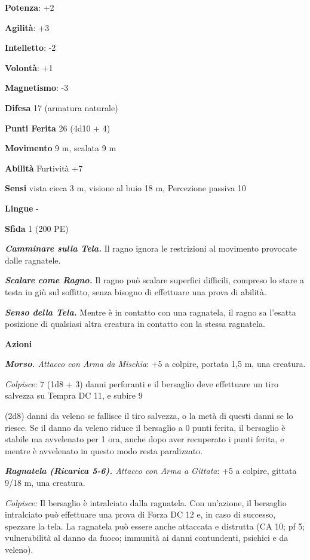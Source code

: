 \begin{multicols}{2}
\textbf{Potenza}: +2

\textbf{Agilità}: +3

\textbf{Intelletto}: -2

\textbf{Volontà}: +1

\textbf{Magnetismo}: -3

\textbf{Difesa} 17 (armatura naturale)

\textbf{Punti Ferita} 26 (4d10 + 4)

\textbf{Movimento} 9 m, scalata 9 m

\textbf{Abilità} Furtività +7

\textbf{Sensi} vista cieca 3 m, visione al buio 18 m, Percezione passiva
10

\textbf{Lingue} -

\textbf{Sfida} 1 (200 PE)

\emph{\textbf{Camminare sulla Tela.}} Il ragno ignora le restrizioni al
movimento provocate dalle ragnatele.

\emph{\textbf{Scalare come Ragno.}} Il ragno può scalare superfici
difficili, compreso lo stare a testa in giù sul soffitto, senza bisogno
di effettuare una prova di abilità.

\emph{\textbf{Senso della Tela.}} Mentre è in contatto con una
ragnatela, il ragno sa l'esatta posizione di qualsiasi altra creatura in
contatto con la stessa ragnatela.

\textbf{Azioni}

\emph{\textbf{Morso.} Attacco con Arma da Mischia}: +5 a colpire,
portata 1,5 m, una creatura.

\emph{Colpisce:} 7 (1d8 + 3) danni perforanti e il bersaglio deve
effettuare un tiro salvezza su Tempra DC 11, e subire 9

(2d8) danni da veleno se fallisce il tiro salvezza, o la metà di questi
danni se lo riesce. Se il danno da veleno riduce il bersaglio a 0 punti
ferita, il bersaglio è stabile ma avvelenato per 1 ora, anche dopo aver
recuperato i punti ferita, e mentre è avvelenato in questo modo resta
paralizzato.

\emph{\textbf{Ragnatela (Ricarica 5-6).} Attacco con Arma a Gittata}: +5
a colpire, gittata 9/18 m, una creatura.

\emph{Colpisce:} Il bersaglio è intralciato dalla ragnatela. Con
un'azione, il bersaglio intralciato può effettuare una prova di Forza DC
12 e, in caso di successo, spezzare la tela. La ragnatela può essere
anche attaccata e distrutta (CA 10; pf 5; vulnerabilità al danno da
fuoco; immunità ai danni contundenti, psichici e da veleno).


\end{multicols}
